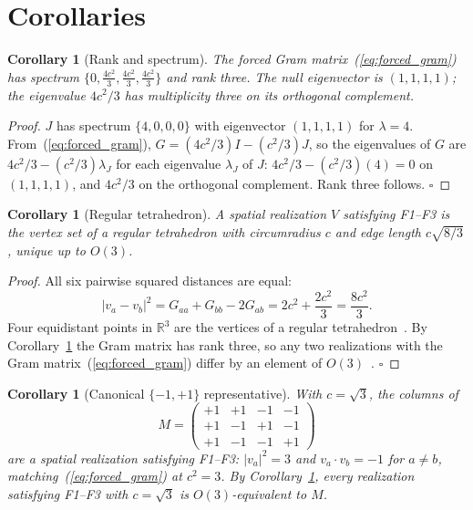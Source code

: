 \documentclass[twocolumn]{iopjournal}
\newtheorem{corollary}[lemma]{Corollary}
\theoremstyle{definition}
\begin{document}

\section*{Corollaries}

\begin{corollary}[Rank and spectrum]
\label{cor:rank}
The forced Gram matrix~(\ref{eq:forced_gram}) has spectrum
$\{0, \tfrac{4c^2}{3}, \tfrac{4c^2}{3}, \tfrac{4c^2}{3}\}$ and rank
three.  The null eigenvector is $(1,1,1,1)$; the eigenvalue $4c^2/3$
has multiplicity three on its orthogonal complement.
\end{corollary}

\begin{proof}
$J$ has spectrum $\{4, 0, 0, 0\}$ with eigenvector $(1,1,1,1)$ for
$\lambda = 4$.  From~(\ref{eq:forced_gram}),
$G = (4c^2/3)I - (c^2/3)J$, so the eigenvalues of $G$ are
$4c^2/3 - (c^2/3)\lambda_J$ for each eigenvalue $\lambda_J$ of $J$:
$4c^2/3 - (c^2/3)(4) = 0$ on $(1,1,1,1)$, and $4c^2/3$ on the
orthogonal complement.  Rank three follows.
\hfill$\square$
\end{proof}

\begin{corollary}[Regular tetrahedron]
\label{cor:tet}
A spatial realization $V$ satisfying F1--F3 is the vertex set of a regular
tetrahedron with circumradius $c$ and edge length $c\sqrt{8/3}$,
unique up to $O(3)$.
\end{corollary}

\begin{proof}
All six pairwise squared distances are equal:
\begin{equation}
  |v_a - v_b|^2 = G_{aa} + G_{bb} - 2 G_{ab}
                = 2c^2 + \frac{2c^2}{3} = \frac{8c^2}{3}.
  \label{eq:edge}
\end{equation}
Four equidistant points in $\mathbb{R}^3$ are the vertices of a
regular tetrahedron~\cite[\S3.7]{Coxeter1973}.  By
Corollary~\ref{cor:rank} the Gram matrix has rank three, so any two
realizations with the Gram
matrix~(\ref{eq:forced_gram}) differ by an element of
$O(3)$~\cite[Thm.~7.3.11]{HornJohnson2013}.
\hfill$\square$
\end{proof}

\begin{corollary}[Canonical $\{-1,+1\}$ representative]
\label{cor:canonical}
With $c = \sqrt{3}$, the columns of
\begin{equation}
  M = \begin{pmatrix}
    +1 & +1 & -1 & -1 \\
    +1 & -1 & +1 & -1 \\
    +1 & -1 & -1 & +1
  \end{pmatrix}
  \label{eq:M}
\end{equation}
are a spatial realization satisfying F1--F3: $|v_a|^2 = 3$ and $v_a \cdot v_b = -1$
for $a \neq b$, matching~(\ref{eq:forced_gram}) at $c^2 = 3$.  By
Corollary~\ref{cor:tet}, every realization satisfying F1--F3 with $c = \sqrt{3}$
is $O(3)$-equivalent to $M$.
\end{corollary}
\end{document}
